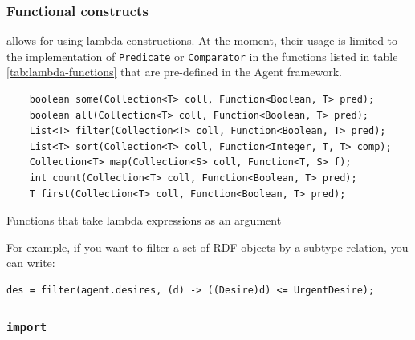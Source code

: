 \subsubsection{Functional constructs}


\vonda allows for using lambda constructions. At the moment, their usage is limited to the implementation of \texttt{Predicate} or \texttt{Comparator} in the functions
 listed in table \ref{tab:lambda-functions} that are pre-defined in the Agent framework.

\begin{table}[htbp]
  \centering
  \begin{small}
	\begin{lstlisting}
	boolean some(Collection<T> coll, Function<Boolean, T> pred);
	boolean all(Collection<T> coll, Function<Boolean, T> pred);
	List<T> filter(Collection<T> coll, Function<Boolean, T> pred);
	List<T> sort(Collection<T> coll, Function<Integer, T, T> comp);
	Collection<T> map(Collection<S> coll, Function<T, S> f);
	int count(Collection<T> coll, Function<Boolean, T> pred);
	T first(Collection<T> coll, Function<Boolean, T> pred);
	\end{lstlisting}
  \end{small}

  \caption{Functions that take lambda expressions as an argument}
  \label{tab:lambda-functions}
\end{table}

For example, if you want to filter a set of RDF objects by a subtype relation, you can write:

\begin{lstlisting}
des = filter(agent.desires, (d) -> ((Desire)d) <= UrgentDesire);
\end{lstlisting}

\subsubsection{\texttt{import}}

